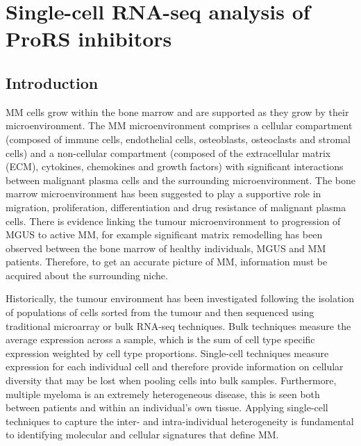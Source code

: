 \chapter{Single-cell RNA-seq analysis of ProRS inhibitors}\label{ch:6-sc}


\section{Introduction}
MM cells grow within the bone marrow and are supported as they grow by their microenvironment.
The MM microenvironment comprises a cellular compartment (composed of immune cells, endothelial cells, osteoblasts, osteoclasts and stromal cells) and a non-cellular compartment (composed of the extracellular matrix (ECM), cytokines, chemokines and growth factors)\cite{manier2012bone, kawano2015targeting} with significant interactions between malignant plasma cells and the surrounding microenvironment.
The bone marrow microenvironment has been suggested to play a supportive role in migration, proliferation, differentiation and drug resistance of malignant plasma cells\cite{ho2020role, manier2012bone}.
There is evidence linking the tumour microenvironment to progression of MGUS to active MM, for example significant matrix remodelling has been observed between the bone marrow of healthy individuals, MGUS and MM patients\cite{kawano2015targeting}.
Therefore, to get an accurate picture of MM, information must be acquired about the surrounding niche.

Historically, the tumour environment has been investigated following the isolation of populations of cells sorted from the tumour and then sequenced using traditional microarray or bulk RNA-seq techniques.
Bulk techniques measure the average expression across a sample, which is the sum of cell type specific expression weighted by cell type proportions.
Single-cell techniques measure expression for each individual cell and therefore provide information on cellular diversity that may be lost when pooling cells into bulk samples.
Furthermore, multiple myeloma is an extremely heterogeneous disease, this is seen both between patients and within an individual's own tissue.
Applying single-cell techniques to capture the inter- and intra-individual heterogeneity is fundamental to identifying molecular and cellular signatures that define MM\@.

